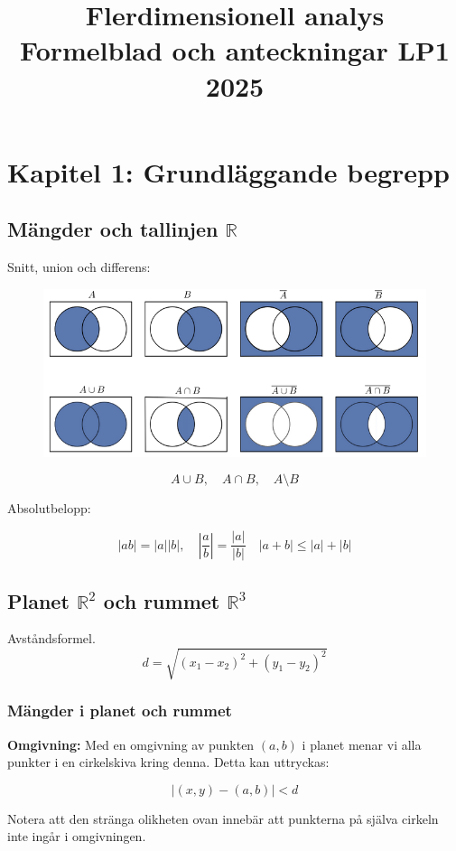 \documentclass[a4paper,12pt]{article}
\title{Flerdimensionell analys \\ Formelblad och anteckningar LP1 2025}
\date{}
\begin{document}
\maketitle

\section{Kapitel 1: Grundläggande begrepp}

\subsection{Mängder och tallinjen $\mathbb{R}$}
Snitt, union och differens:
\begin{figure}[H]
  \centering
  \includegraphics[width=1\textwidth]{snittuniondifferens.png}
  \caption{}
\end{figure}

\[
A \cup B, \quad A \cap B, \quad A \setminus B
\]

Absolutbelopp:

\[
    |ab| = |a||b|, \quad |\frac{a}{b}| = \frac{|a|}{|b|} \quad |a+b| \leq |a| + |b|
\]

\subsection{Planet $\mathbb{R}^2$ och rummet $\mathbb{R}^3$}
Avståndsformel.  
\[
    d = \sqrt{(x_1 - x_2)^2 + (y_1 - y_2)^2}
\]

\subsubsection*{Mängder i planet och rummet}
\textbf{Omgivning:}  
Med en omgivning av punkten $(a, b)$ i planet menar vi alla punkter i en cirkelskiva kring denna. Detta kan uttryckas:

\[
|(x,y) - (a,b)| < d
\]

Notera att den stränga olikheten ovan innebär att punkterna på själva cirkeln inte ingår i omgivningen.
\end{document}
